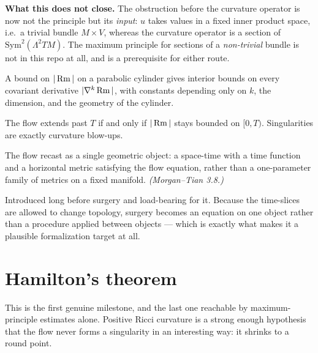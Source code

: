 \begin{theorem}
  \textbf{What this does not close.} The obstruction before the curvature operator is now not
  the principle but its \emph{input}: $u$ takes values in a fixed inner product space, i.e.\ a
  trivial bundle $M \times V$, whereas the curvature operator is a section of
  $\mathrm{Sym}^2(\Lambda^2 TM)$. The maximum principle for sections of a \emph{non-trivial}
  bundle is not in this repo at all, and is a prerequisite for either route.
\end{theorem}


\begin{theorem}
  \label{thm:shi}
  A bound on $|\operatorname{Rm}|$ on a parabolic cylinder gives interior bounds on every
  covariant derivative $|\nabla^k \operatorname{Rm}|$, with constants depending only on $k$,
  the dimension, and the geometry of the cylinder.
\end{theorem}

\begin{theorem}
  \label{thm:long-time}
  The flow extends past $T$ if and only if $|\operatorname{Rm}|$ stays bounded on $[0,T)$.
  Singularities are exactly curvature blow-ups.
\end{theorem}

\begin{definition}
  \label{def:generalized-flow}
  The flow recast as a single geometric object: a space-time with a time
  function and a horizontal metric satisfying the flow equation, rather than a
  one-parameter family of metrics on a fixed manifold.
  \emph{(Morgan--Tian 3.8.)}

  Introduced long before surgery and load-bearing for it. Because the
  time-slices are allowed to change topology, surgery becomes an equation on one
  object rather than a procedure applied between objects --- which is exactly
  what makes it a plausible formalization target at all.
\end{definition}

\chapter{Hamilton's theorem}
\label{chap:hamilton}

This is the first genuine milestone, and the last one reachable by
maximum-principle estimates alone. Positive Ricci curvature is a strong enough
hypothesis that the flow never forms a singularity in an interesting way: it
shrinks to a round point.

